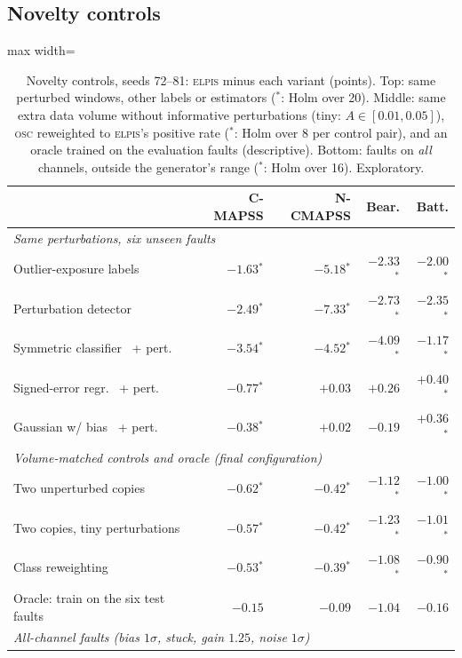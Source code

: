 \documentclass{esannV2}
\newcommand{\OSC}{\textsc{osc}}
\newcommand{\RPT}{\textsc{elpis}}
\newcommand{\s}{$^{\ast}$}
\begin{document}
\FloatBarrier
\subsection{Novelty controls}\label{app:novelty}
\begin{table}[!htbp]
\caption{Novelty controls, seeds 72--81: \RPT{} minus each variant (points). Top: same perturbed windows, other labels or estimators (\s: Holm over 20). Middle: same extra data volume without informative perturbations (tiny: $A\in[0.01,0.05]$), \OSC{} reweighted to \RPT's positive rate (\s: Holm over 8 per control pair), and an oracle trained on the evaluation faults (descriptive). Bottom: faults on \emph{all} channels, outside the generator's range (\s: Holm over 16). Exploratory.}
\label{tab:novelty}
\centering\footnotesize
\begin{adjustbox}{max width=\textwidth}\begin{tabular}{lrrrr}
\toprule
 & C-MAPSS & N-CMAPSS & Bear. & Batt.\\
\midrule
\multicolumn{5}{l}{\emph{Same perturbations, six unseen faults}}\\
Outlier-exposure labels~\cite{hendrycks2019deep} & $-1.63$\s & $-5.18$\s & $-2.33$\s & $-2.00$\s\\
Perturbation detector~\cite{isermann2005model} & $-2.49$\s & $-7.33$\s & $-2.73$\s & $-2.35$\s\\
Symmetric classifier~\cite{corbiere2019addressing,kamath2020selective} + pert. & $-3.54$\s & $-4.52$\s & $-4.09$\s & $-1.17$\s\\
Signed-error regr.~\cite{yoo2019learning} + pert. & $-0.77$\s & $+0.03$ & $+0.26$ & $+0.40$\s\\
Gaussian w/ bias~\cite{nix1994estimating} + pert. & $-0.38$\s & $+0.02$ & $-0.19$ & $+0.36$\s\\
\midrule
\multicolumn{5}{l}{\emph{Volume-matched controls and oracle (final configuration)}}\\
Two unperturbed copies & $-0.62$\s & $-0.42$\s & $-1.12$\s & $-1.00$\s\\
Two copies, tiny perturbations & $-0.57$\s & $-0.42$\s & $-1.23$\s & $-1.01$\s\\
Class reweighting & $-0.53$\s & $-0.39$\s & $-1.08$\s & $-0.90$\s\\
Oracle: train on the six test faults & $-0.15$ & $-0.09$ & $-1.04$ & $-0.16$\\
\midrule
\multicolumn{5}{l}{\emph{All-channel faults (bias $1\sigma$, stuck, gain $1.25$, noise $1\sigma$)}}\\

\end{tabular}
\end{adjustbox}
\end{table}
\end{document}
